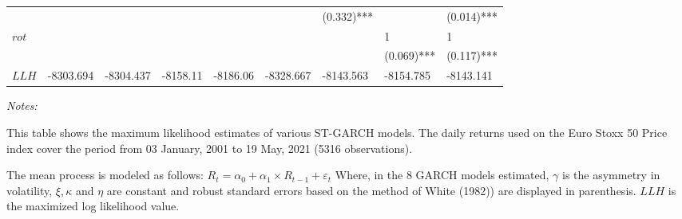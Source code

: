 \documentclass[a4paper, twoside]{templates/ociamthesis}
\begin{document}
\begin{landscape}
\begin{table}
\begin{threeparttable}
{\begin{tabular}[t]{lllllllll}
 &  &  &  &  &  & (0.332)*** &  & (0.014)***\\
$rot$ &  &  &  &  &  &  & 1 & 1\\
 &  &  &  &  &  &  & (0.069)*** & (0.117)***\\
\addlinespace
$LLH$ & -8303.694 & -8304.437 & -8158.11 & -8186.06 & -8328.667 & -8143.563 & -8154.785 & -8143.141\\
\bottomrule
\end{tabular}}
\begin{tablenotes}
\item \textit{Notes:} 
\item This table shows the maximum likelihood estimates of various ST-GARCH models. The daily returns used on the Euro Stoxx 50 Price index cover the period from 03 January, 2001 to 19 May, 2021 (5316 observations).
\item The mean process is modeled as follows: $R_t= \alpha_0+ \alpha_1 \times R_{t-1}+ \varepsilon_t$ Where, in the 8 GARCH models estimated, $\gamma$ is the asymmetry in volatility, $\xi, \kappa$ and $\eta$ are constant and robust standard errors based on the method of White (1982)) are displayed in parenthesis. $LLH$ is the maximized log likelihood value.
\end{tablenotes}
\end{threeparttable}
\end{table}
\end{landscape}

\clearpage
\newpage
\end{document}
